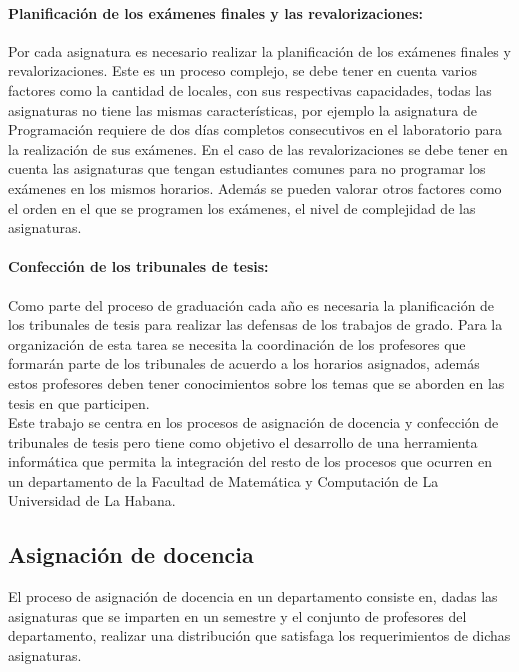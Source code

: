 \paragraph{Planificación de los exámenes finales y las revalorizaciones:}
Por cada asignatura es necesario realizar la planificación de los exámenes
finales y revalorizaciones. Este es un proceso complejo, se debe tener en cuenta 
varios factores como la cantidad de locales, con sus respectivas capacidades,
todas las asignaturas no tiene las mismas características, por ejemplo la asignatura de 
Programación requiere de dos días completos consecutivos en el laboratorio para 
la realización de sus exámenes. En el caso de las revalorizaciones
se debe tener en cuenta las asignaturas que tengan estudiantes comunes para no programar los 
exámenes en los mismos horarios. Además se pueden valorar otros factores como el orden en el que 
se programen los exámenes, el nivel de complejidad de las asignaturas.

\paragraph{Confección de los tribunales de tesis:}
Como parte del proceso de graduación cada año 
es necesaria la planificación de los tribunales de tesis para 
realizar las defensas de los trabajos de grado. Para la organización 
de esta tarea se necesita la coordinación de los profesores que formarán parte 
de los tribunales de acuerdo a los horarios asignados, además estos profesores 
deben tener conocimientos sobre los temas que se aborden en las tesis en que participen. \\


Este trabajo se centra en los procesos de asignación de docencia y confección de tribunales
de tesis pero tiene como objetivo el desarrollo de una herramienta informática que permita
la integración del resto de los procesos que ocurren en un departamento de la 
Facultad de Matemática y Computación de La Universidad de La Habana.



\subsection{Asignación de docencia}
El proceso de asignación de docencia en un departamento consiste en, 
dadas las asignaturas que se imparten en un semestre y el conjunto de 
profesores del departamento, realizar una distribución que satisfaga los
requerimientos de dichas asignaturas.

